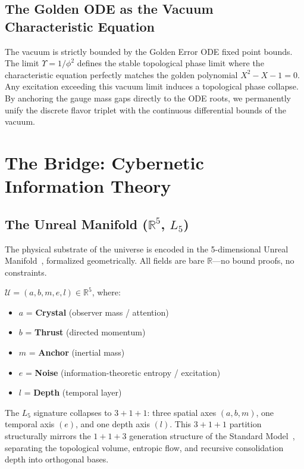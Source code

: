 \subsection{The Golden ODE as the Vacuum Characteristic Equation}
The vacuum is strictly bounded by the Golden Error ODE fixed point bounds. The limit $\Upsilon = 1/\phi^2$ defines the stable topological phase limit where the characteristic equation perfectly matches the golden polynomial $X^2 - X - 1 = 0$. Any excitation exceeding this vacuum limit induces a topological phase collapse. By anchoring the gauge mass gaps directly to the ODE roots, we permanently unify the discrete flavor triplet with the continuous differential bounds of the vacuum.

\section{The Bridge: Cybernetic Information Theory}

\subsection{The Unreal Manifold ($\mathbb{R}^5$, $L_5$)}

The physical substrate of the universe is encoded in the 5-dimensional Unreal Manifold~\cite{GoldenTetrahedron}, formalized geometrically. All fields are bare $\mathbb{R}$---no bound proofs, no constraints.

\begin{definition}
$\mathcal{U} = (a, b, m, e, l) \in \mathbb{R}^5$, where:
\begin{itemize}
    \item $a$ = \textbf{Crystal} (observer mass / attention)
    \item $b$ = \textbf{Thrust} (directed momentum)
    \item $m$ = \textbf{Anchor} (inertial mass)
    \item $e$ = \textbf{Noise} (information-theoretic entropy / excitation)
    \item $l$ = \textbf{Depth} (temporal layer)
\end{itemize}
The $L_5$ signature collapses to $3 + 1 + 1$: three spatial axes $(a, b, m)$, one temporal axis $(e)$, and one depth axis $(l)$. This $3+1+1$ partition structurally mirrors the $1+1+3$ generation structure of the Standard Model~\cite{PDG2025}, separating the topological volume, entropic flow, and recursive consolidation depth into orthogonal bases.
\end{definition}

